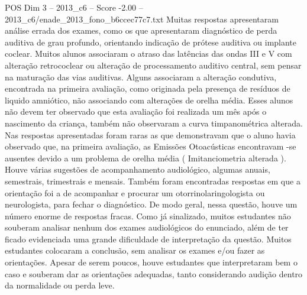 \begin{textsample}{POS Dim 3 – 2013\_c6 – Score -2.00 – 2013\_c6/enade\_2013\_fono\_b6ccec77c7.txt}
Muitas respostas apresentaram análise errada dos exames, como os que apresentaram diagnóstico de perda auditiva de grau profundo, orientando indicação de prótese auditiva ou implante coclear.
Muitos alunos associaram o atraso das latências das ondas III e V com alteração retrococlear ou alteração de processamento auditivo central, sem pensar na maturação das vias auditivas.
Alguns associaram a alteração condutiva, encontrada na primeira avaliação, como originada pela presença de resíduos de liquido amniótico, não associando com alterações de orelha média.
Esses alunos não devem ter observado que esta avaliação foi realizada um mês após o nascimento da criança, também não observaram a curva timpanométrica alterada.
Nas respostas apresentadas foram raras as que demonstravam que o aluno havia observado que, na primeira avaliação, as Emissões Otoacústicas encontravam -se ausentes devido a um problema de orelha média ( Imitanciometria alterada ).
Houve várias sugestões de acompanhamento audiológico, algumas anuais, semestrais, trimestrais e mensais.
Também foram encontradas respostas em que a orientação foi a de acompanhar e procurar um otorrinolaringologista ou neurologista, para fechar o diagnóstico.
De modo geral, nessa questão, houve um número enorme de respostas fracas.
Como já sinalizado, muitos estudantes não souberam analisar nenhum dos exames audiológicos do enunciado, além de ter ficado evidenciada uma grande dificuldade de interpretação da questão.
Muitos estudantes colocaram a conclusão, sem analisar os exames e/ou fazer as orientações.
Apesar de serem poucos, houve estudantes que interpretaram bem o caso e souberam dar as orientações adequadas, tanto considerando audição dentro da normalidade ou perda leve.

\end{textsample}
